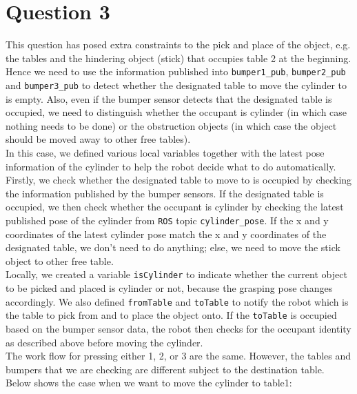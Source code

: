 \documentclass[a4paper,12pt]{article}
\begin{document}
\section{Question 3}
This question has posed extra constraints to the pick and place of the object, e.g. the tables and the hindering object (stick) that occupies table 2 at the beginning. Hence we need to use the information published into \texttt{bumper1\_pub}, \texttt{bumper2\_pub} and \texttt{bumper3\_pub} to detect whether the designated table to move the cylinder to is empty. Also, even if the bumper sensor detects that the designated table is occupied, we need to distinguish whether the occupant is cylinder (in which case nothing needs to be done) or the obstruction objects (in which case the object should be moved away to other free tables). \\

In this case, we defined various local variables together with the latest pose information of the cylinder to help the robot decide what to do automatically. Firstly, we check whether the designated table to move to is occupied by checking the information published by the bumper sensors. If the designated table is occupied, we then check whether the occupant is cylinder by checking the latest published pose of the cylinder from \texttt{ROS} topic \texttt{cylinder\_pose}. If the x and y coordinates of the latest cylinder pose match the x and y coordinates of the designated table, we don't need to do anything; else, we need to move the stick object to other free table. \\

Locally, we created a variable \texttt{isCylinder} to indicate whether the current object to be picked and placed is cylinder or not, because the grasping pose changes accordingly. We also defined \texttt{fromTable} and \texttt{toTable} to notify the robot which is the table to pick from and to place the object onto. If the \texttt{toTable} is occupied based on the bumper sensor data, the robot then checks for the occupant identity as described above before moving the cylinder. \\

The work flow for pressing either 1, 2, or 3 are the same. However, the tables and bumpers that we are checking are different subject to the destination table. Below shows the case when we want to move the cylinder to table1:
\end{document}
